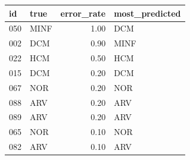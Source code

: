 \begin{tabular}{llrl}
\toprule
id & true & error\_rate & most\_predicted \\
\midrule
050 & MINF & 1.00 & DCM \\
002 & DCM & 0.90 & MINF \\
022 & HCM & 0.50 & HCM \\
015 & DCM & 0.20 & DCM \\
067 & NOR & 0.20 & NOR \\
088 & ARV & 0.20 & ARV \\
089 & ARV & 0.20 & ARV \\
065 & NOR & 0.10 & NOR \\
082 & ARV & 0.10 & ARV \\
\bottomrule
\end{tabular}
